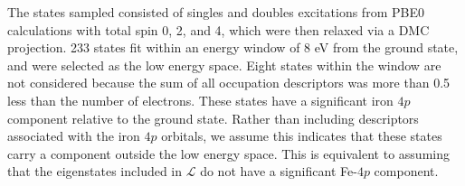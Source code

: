 The states sampled consisted of singles and doubles excitations from PBE0 calculations with total spin 0, 2, and 4, which were then relaxed via a DMC projection.
233 states fit within an energy window of 8 eV from the ground state, and were selected as the low energy space.
Eight states within the window are not considered because the sum of all occupation descriptors was more than 0.5 less than the number of electrons.
These states have a significant iron $4p$ component relative to the ground state. 
Rather than including descriptors associated with the iron $4p$ orbitals, we assume this indicates that these states carry a component outside the low energy space. 
This is equivalent to assuming that the eigenstates included in $\mathcal{L}$ do not have a significant Fe-$4p$ component.
 

